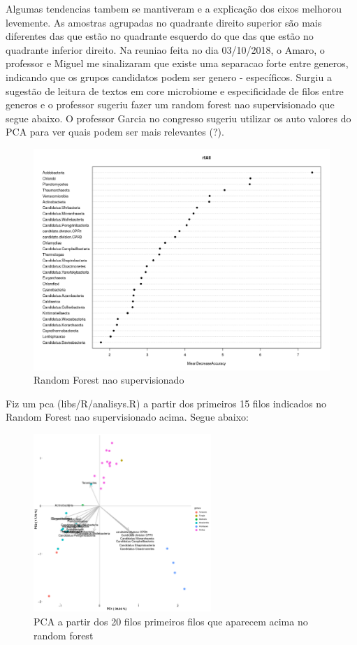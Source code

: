 \documentclass[12pt, a4paper]{report}
\begin{document}
Algumas tendencias tambem se mantiveram e a explicação dos eixos melhorou levemente. As amostras agrupadas no quadrante direito superior são mais diferentes das que estão no quadrante esquerdo do que das que estão no quadrante inferior direito. Na reuniao feita no dia 03/10/2018, o Amaro, o professor e Miguel me sinalizaram que existe uma separacao forte entre generos, indicando que os grupos candidatos podem ser genero - específicos. Surgiu a sugestão de leitura de textos em core microbiome e especificidade de filos entre generos e o professor sugeriu fazer um random forest nao supervisionado que segue abaixo. O professor Garcia no congresso sugeriu utilizar os auto valores do PCA para ver quais podem ser mais relevantes (?).

\begin{figure}[H]
\centering
  \includegraphics[scale=0.5]{figures/randomforest_nao_supervisionado_corais_leticia_2018_10_18.jpeg}
  \caption{Random Forest nao supervisionado}
  \end{figure}

Fiz um pca (libs/R/analisys.R) a partir dos primeiros 15 filos indicados no Random Forest  nao supervisionado acima. Segue abaixo:

\begin{figure}[H]
  \centering 
  \includegraphics[width=0.6\textwidth]{figures/rf_nao_supervisionado_pca_corais_20_filos_15_10_2018_edited.png}
  \caption{PCA a partir dos 20 filos primeiros filos que aparecem acima no random forest}
  \end{figure}
\end{document}
